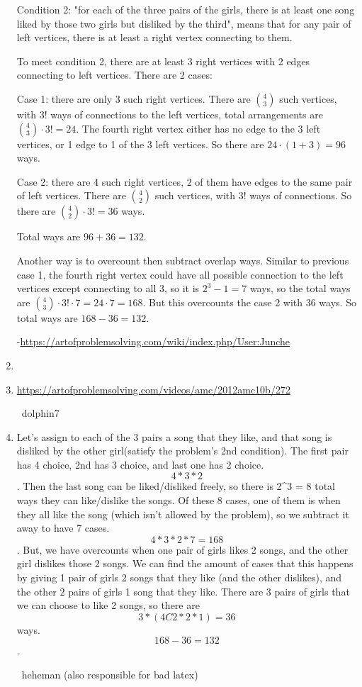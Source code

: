 \documentclass{article}%
\begin{document}
\begin{enumerate}
Condition 2: "for each of the three pairs of the girls, there is at least one song liked by those two girls but disliked by the third", means that for any pair of left vertices, there is at least a right vertex connecting to them.

To meet condition 2, there are at least 3 right vertices with 2 edges connecting to left vertices.  There are 2 cases:

Case 1: there are only 3 such right vertices. There are $\binom{4}{3}$ such vertices, with $3!$ ways of connections to the left vertices, total arrangements are $\binom{4}{3}\cdot3! = 24$. The fourth right vertex either has no edge to the 3 left vertices, or 1 edge to 1 of the 3 left vertices.  So there are $24\cdot(1+3) = 96$ ways.

Case 2: there are 4 such right vertices, 2 of them have edges to the same pair of left vertices.  There are $\binom{4}{2}$ such vertices, with $3!$ ways of connections.  So there are $\binom{4}{2}\cdot3! = 36$ ways.

Total ways are $96+36=132$.

Another way is to overcount then subtract overlap ways.  Similar to previous case 1,  the fourth right vertex could have all possible connection to the left vertices except connecting to all 3, so it is $2^3-1=7$ ways, so the total ways are $\binom{4}{3}\cdot3!\cdot7 = 24\cdot7 = 168$.  But this overcounts the case 2 with 36 ways.  So total ways are $168-36=132$.

-\href{https://artofproblemsolving.com/wiki/index.php/User:Junche}{https://artofproblemsolving.com/wiki/index.php/User:Junche}

%
\item%
%
\item%
\href{https://artofproblemsolving.com/videos/amc/2012amc10b/272}{https://artofproblemsolving.com/videos/amc/2012amc10b/272}

~dolphin7

%
\item%
Let's assign to each of the 3 pairs a song that they like, and that song is disliked by the other girl(satisfy the problem's 2nd condition). The first pair has 4 choice, 2nd has 3 choice, and last one has 2 choice. \[4 * 3 * 2\]. Then the last song can be liked/disliked freely, so there is 2^3 = 8 total ways they can like/dislike the songs. Of these 8 cases, one of them is when they all like the song (which isn't allowed by the problem), so we subtract it away to have 7 cases. \[4 * 3 * 2 * 7 = 168\]. But, we have overcounts when one pair of girls likes 2 songs, and the other girl dislikes those 2 songs. We can find the amount of cases that this happens by giving 1 pair of girls 2 songs that they like (and the other dislikes), and the other 2 pairs of girls 1 song that they like. There are 3 pairs of girls that we can choose to like 2 songs, so there are \[3 * (4C2 * 2 * 1) = 36\] ways. \[168 - 36 = 132\].

~heheman (also responsible for bad latex)

%
\end{enumerate}
\end{document}

